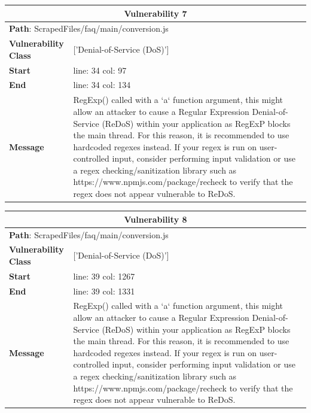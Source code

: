 \documentclass[12pt]{article}
\begin{document}
\vspace{0.7cm}
\FloatBarrier
\begin{table}[!h]
\centering
\renewcommand{\arraystretch}{1.3}
\begin{tabular}{|l|p{10cm}|}
\hline
\multicolumn{2}{|c|}{\textbf{Vulnerability 7}} \\
\hline
\multicolumn{2}{|l|}{\textbf{Path}: ScrapedFiles/faq/main/conversion.js} \\
\hline
\textbf{Vulnerability Class} & ['Denial-of-Service (DoS)'] \\
\hline
\textbf{Start} & line: 34 \quad col: 97 \\
\hline
\textbf{End} & line: 34 \quad col: 134 \\
\hline
\textbf{Message} & RegExp() called with a `a` function argument, this might allow an attacker to cause a Regular Expression Denial-of-Service (ReDoS) within your application as RegExP blocks the main thread. For this reason, it is recommended to use hardcoded regexes instead. If your regex is run on user-controlled input, consider performing input validation or use a regex checking/sanitization library such as https://www.npmjs.com/package/recheck to verify that the regex does not appear vulnerable to ReDoS. \\
\hline
\end{tabular}
\end{table}
\vspace{0.7cm}
\FloatBarrier
\begin{table}[!h]
\centering
\renewcommand{\arraystretch}{1.3}
\begin{tabular}{|l|p{10cm}|}
\hline
\multicolumn{2}{|c|}{\textbf{Vulnerability 8}} \\
\hline
\multicolumn{2}{|l|}{\textbf{Path}: ScrapedFiles/faq/main/conversion.js} \\
\hline
\textbf{Vulnerability Class} & ['Denial-of-Service (DoS)'] \\
\hline
\textbf{Start} & line: 39 \quad col: 1267 \\
\hline
\textbf{End} & line: 39 \quad col: 1331 \\
\hline
\textbf{Message} & RegExp() called with a `a` function argument, this might allow an attacker to cause a Regular Expression Denial-of-Service (ReDoS) within your application as RegExP blocks the main thread. For this reason, it is recommended to use hardcoded regexes instead. If your regex is run on user-controlled input, consider performing input validation or use a regex checking/sanitization library such as https://www.npmjs.com/package/recheck to verify that the regex does not appear vulnerable to ReDoS. \\
\hline
\end{tabular}
\end{table}
\end{document}
